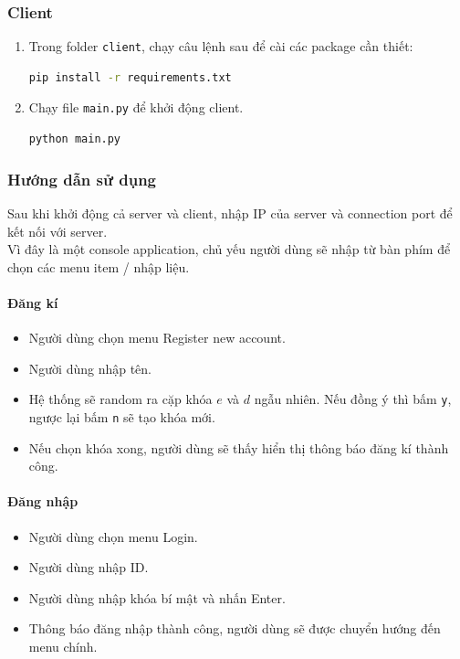\documentclass[12pt]{article}
\begin{document}
\subsubsection{Client}
\begin{enumerate}
\item Trong folder \texttt{client}, chạy câu lệnh sau để cài các package cần thiết:
\begin{lstlisting}[language=bash]
pip install -r requirements.txt
\end{lstlisting}

\item Chạy file \texttt{main.py} để khởi động client.
\begin{lstlisting}[language=bash]
python main.py
\end{lstlisting}
\end{enumerate}

\subsubsection{Hướng dẫn sử dụng}
Sau khi khởi động cả server và client, nhập IP của server và connection port để kết nối với server.
\\
Vì đây là một console application, chủ yếu người dùng sẽ nhập từ bàn phím để chọn các menu item / nhập liệu. 

\paragraph{Đăng kí}
\begin{itemize}
    \item Người dùng chọn menu Register new account.
    \item Người dùng nhập tên.
    \item Hệ thống sẽ random ra cặp khóa $e$ và $d$ ngẫu nhiên. Nếu đồng ý thì bấm \texttt{y}, ngược lại bấm \texttt{n} sẽ tạo khóa mới.
    \item Nếu chọn khóa xong, người dùng sẽ thấy hiển thị thông báo đăng kí thành công.
\end{itemize}

\paragraph{Đăng nhập}
\begin{itemize}
    \item Người dùng chọn menu Login.
    \item Người dùng nhập ID.
    \item Người dùng nhập khóa bí mật và nhấn Enter.
    \item Thông báo đăng nhập thành công, người dùng sẽ được chuyển hướng đến menu chính.
\end{itemize}
\end{document}
